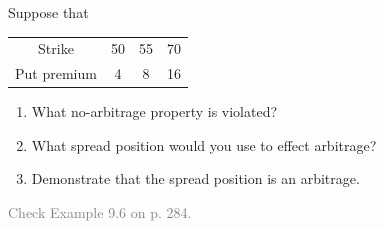 \begin{frame}[fragile,t]
\begin{myexample}
	Suppose that
	\begin{center}
		\renewcommand{\arraystretch}{1.2}
		\begin{tabular}{cccc}
			Strike      & 50 & 55 & 70 \\
			Put premium & 4  & 8  & 16 \\
		\end{tabular}
		\begin{enumerate}
			\item What no-arbitrage property is violated?
			\item What spread position would you use to effect arbitrage?
			\item Demonstrate that the spread position is an arbitrage.
		\end{enumerate}
	\end{center}
\end{myexample}
\pause
\bigskip
\begin{mysol}
	\textcolor{gray}{Check Example 9.6 on p. 284.} \myEnd
\end{mysol}
\end{frame}


